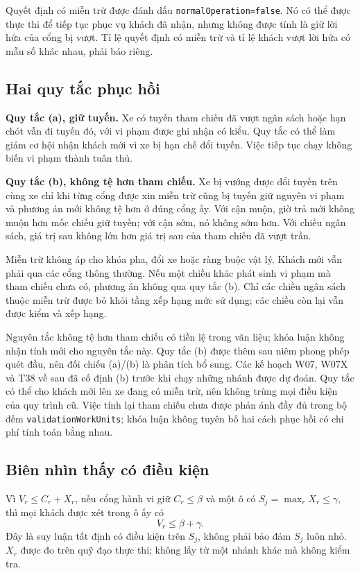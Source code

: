 Quyết định có miễn trừ được đánh dấu \texttt{normalOperation=false}. Nó có thể được thực thi
để tiếp tục phục vụ khách đã nhận, nhưng không được tính là giữ lời hứa của cổng bị vượt.
Tỉ lệ quyết định có miễn trừ và tỉ lệ khách vượt lời hứa có mẫu số khác nhau, phải báo riêng.

\subsection{Hai quy tắc phục hồi}

\textbf{Quy tắc (a), giữ tuyến.} Xe có tuyến tham chiếu đã vượt ngân sách hoặc hạn chót vẫn
đi tuyến đó, với vi phạm được ghi nhận có kiểu. Quy tắc có thể làm giảm cơ hội nhận khách
mới vì xe bị hạn chế đổi tuyến. Việc tiếp tục chạy không biến vi phạm thành tuân thủ.

\textbf{Quy tắc (b), không tệ hơn tham chiếu.} Xe bị vướng được đổi tuyến trên cùng xe chỉ
khi từng cổng được xin miễn trừ cũng bị tuyến giữ nguyên vi phạm và phương án mới không
tệ hơn ở đúng cổng ấy. Với cận muộn, giờ trả mới không muộn hơn mốc chiếu giữ tuyến; với cận sớm,
nó không sớm hơn. Với chiều ngân sách, giá trị sau không lớn hơn giá trị sau của tham chiếu
đã vượt trần.

Miễn trừ không áp cho khóa pha, đổi xe hoặc ràng buộc vật lý. Khách mới vẫn phải qua các
cổng thông thường. Nếu một chiều khác phát sinh vi phạm mà tham chiếu chưa có, phương án
không qua quy tắc (b). Chỉ các chiều ngân sách thuộc miễn trừ được bỏ khỏi tầng xếp hạng
mức sử dụng; các chiều còn lại vẫn được kiểm và xếp hạng.

Nguyên tắc không tệ hơn tham chiếu có tiền lệ trong văn liệu; khóa luận không nhận tính mới
cho nguyên tắc này. Quy tắc (b) được thêm sau niêm phong phép quét đầu, nên đối chiếu (a)/(b) là phân tích bổ
sung. Các kế hoạch W07, W07X và T38 về sau đã cố định (b) trước khi chạy những nhánh được
dự đoán. Quy tắc có thể cho khách mới lên xe đang có miễn trừ, nên không trùng mọi điều kiện
của quy trình cũ. Việc tính lại tham chiếu chưa được phản ánh đầy đủ trong bộ đếm
\texttt{validationWorkUnits}; khóa luận không tuyên bố hai cách phục hồi có chi phí tính
toán bằng nhau.

\subsection{Biên nhìn thấy có điều kiện}
\label{muc:biendukien}

Vì $V_r\le C_r+X_r$, nếu cổng hành vi giữ $C_r\le\beta$ và một ô có
$S_j=\max_r X_r\le\gamma$, thì mọi khách được xét trong ô ấy có
\begin{equation}
V_r\le\beta+\gamma.
\end{equation}
Đây là suy luận tất định có điều kiện trên $S_j$, không phải bảo đảm $S_j$ luôn nhỏ. $X_r$
được đo trên quỹ đạo thực thi; không lấy từ một nhánh khác mà không kiểm tra.

